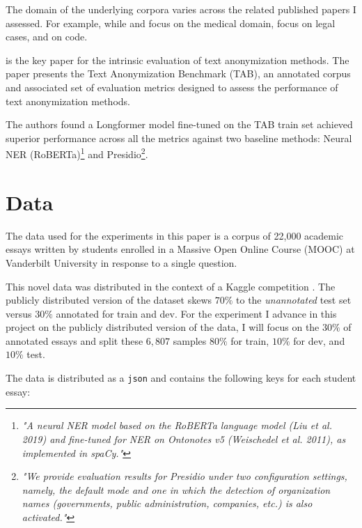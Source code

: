 \documentclass[11pt]{article}
\begin{document}
The domain of the underlying corpora varies across the related published papers I assessed. For example, while \citealt{hathurusinghe-etal-2021-privacy} and \citealt{vakili-etal-2022-downstream} focus on the medical domain, \citealt{pilan-etal-2022-text} focus on legal cases, and \citealt{vanderplas2022detecting} on code.

\citealt{pilan-etal-2022-text} is the key paper for the intrinsic evaluation of text anonymization methods. The paper presents the Text Anonymization Benchmark (TAB), an annotated corpus and associated set of evaluation metrics designed to assess the performance of text anonymization methods. 

The authors found a Longformer model fine-tuned on the TAB train set achieved superior performance across all the metrics against two baseline methods: Neural NER (RoBERTa)\footnote{\textit{"A neural NER model based on the RoBERTa language model (Liu et al. 2019) and fine-tuned for NER on Ontonotes v5 (Weischedel et al. 2011), as implemented in spaCy."}} and Presidio\footnote{\textit{"We provide evaluation results for Presidio under two configuration settings, namely, the default mode and one in which the detection of organization names (governments, public administration, companies, etc.) is also activated."}}.

\section{Data}

The data used for the experiments in this paper is a corpus of 22,000 academic essays written by students enrolled in a Massive Open Online Course (MOOC) at Vanderbilt University in response to a single question.

This novel data was distributed in the context of a Kaggle competition \cite{pii-detection-removal-from-educational-data}. The publicly distributed version of the dataset skews $70\%$ to the \textit{unannotated} test set versus $30\%$ annotated for train and dev. For the experiment I advance in this project on the publicly distributed version of the data, I will focus on the $30\%$ of annotated essays and split these $6,807$ samples $80\%$ for train, $10\%$ for dev, and $10\%$ test.

The data is distributed as a \texttt{json} \cite{pii-detection-removal-from-educational-data} and contains the following keys for each student essay:
\end{document}
